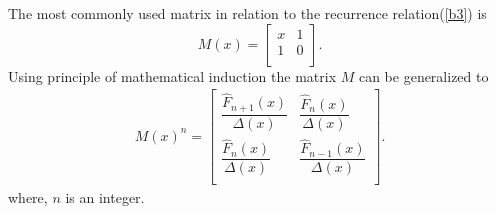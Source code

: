 The most commonly used matrix in relation to the recurrence relation(\ref{b3}) is
\begin{equation*}\label{b8} 
 M(x) = {\left[
          \begin{array}{cc}
            x& 1\\
            1 & 0 \\
          \end{array}
        \right]}.
\end{equation*}
Using principle of mathematical induction the matrix $M$ can be generalized to
\begin{align*}
 M(x)^n = {\left[
          \begin{array}{cc}
            \dfrac{\widehat{F}_{n+1}(x)}{\Delta(x)} &\dfrac{\widehat{F}_{n}(x)}{\Delta(x)} \\
            \dfrac{\widehat{F}_{n}(x)}{\Delta(x)} &\dfrac{ \widehat{F}_{n-1}(x)}{\Delta(x)} \\
          \end{array}
        \right]}.
\end{align*}
where, $n$ is an integer.

